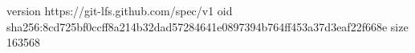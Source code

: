 version https://git-lfs.github.com/spec/v1
oid sha256:8cd725bf0ccff8a214b32dad57284641e0897394b764ff453a37d3eaf22f668e
size 163568
